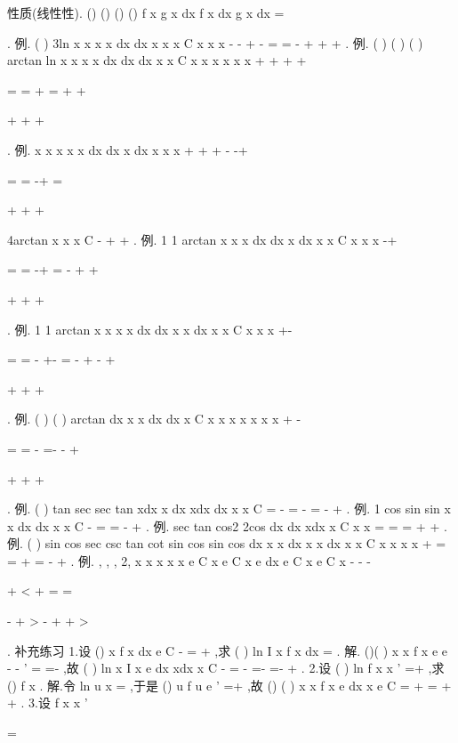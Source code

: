 \textcolor{lyred}{性质(线性性)}.
()
()
()
()
f
x
g x
dx
f
x dx
g x dx
\alpha 
\beta 
\alpha 
\beta 
\pm 
=
\pm 




\int 
\int 
\int 
. 
\textcolor{lyred}{例}. (
)
3ln
x
x
x
x
dx
dx
x
x
x
C
x
x
x
-
-
+
-
=
=
-
+
+
+
\int 
\int 
. 
\textcolor{lyred}{例}.
(
)
(
)
(
)
arctan
ln
x
x
x
x dx
dx
dx
x
x
C
x
x
x
x
x
x
+
+
+
+


=
=
+
=
+
+


+
+
+


\int 
\int 
\int 
. 
\textcolor{lyred}{例}.
x
x
x
x
x
dx
dx
x
dx
x
x
x
+
+
+
-
-+


=
=
-+
=


+
+
+


\int 
\int 
\int 
4arctan
x
x
x
C
-
+
+
. 
\textcolor{lyred}{例}.
1 1
arctan
x
x
x
dx
dx
x
dx
x
x
C
x
x
x
-+


=
=
-+
=
-
+
+


+
+
+


\int 
\int 
\int 
. 
\textcolor{lyred}{例}.
1 1
arctan
x
x
x
x
dx
dx
x
x
dx
x
x
C
x
x
x
+-


=
=
-
+-
=
-
+
-
+


+
+
+


\int 
\int 
\int 
. 
\textcolor{lyred}{例}.
(
)
(
)
arctan
dx
x
x dx
dx
x
C
x
x
x
x
x
x
x
+
-


=
=
-
=-
-
+


+
+
+


\int 
\int 
\int 
. 
\textcolor{lyred}{例}.
(
)
tan
sec
sec
tan
xdx
x
dx
xdx
dx
x
x
C
=
-
=
-
=
-
+
\int 
\int 
\int 
\int 
. 
\textcolor{lyred}{例}.
1 cos
sin
sin
x
x
dx
dx
x
x
C
-
=
=
-
+
\int 
\int 
. 
\textcolor{lyred}{例}.
sec
tan
cos2
2cos
dx
dx
xdx
x
C
x
x
=
=
=
+
+
\int 
\int 
\int 
. 
\textcolor{lyred}{例}.
(
)
sin
cos
sec
csc
tan
cot
sin
cos
sin
cos
dx
x
x dx
x
x dx
x
x
C
x
x
x
x
+
=
=
+
=
-
+
\int 
\int 
\int 
. 
\textcolor{lyred}{例}.
,
,
,
2,
x
x
x
x
x
e
C
x
e
C
x
e
dx
e
C
x
e
C
x
-
-
-


+
<
+
\le 
=
=


-
+
>
-
+
+
>


\int 
. 
\textcolor{lyred}{补充练习 }
1.设
()
x
f x dx
e
C
-
=
+
\int 
,求
(
)
ln
I
x f
x dx
=\int 
. 
解.
()(
)
x
x
f x
e
e
-
-
'
=
=-
,故
(
)
ln
x
I
x
e
dx
xdx
x
C
-
=
-
=-
=-
+
\int 
\int 
. 
2.设
(
)
ln
f
x
x
'
=+
,求
()
f x . 
解.令
ln
u
x
=
,于是
()
u
f
u
e
'
=+
,故
()
(
)
x
x
f x
e
dx
x
e
C
=
+
=
+
+
\int 
. 
3.设
f
x
x
'




=








